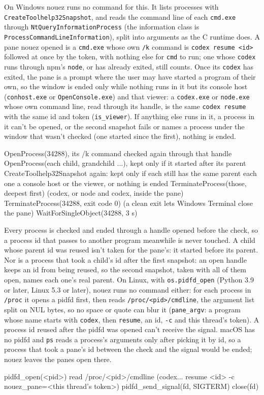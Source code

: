 \documentclass[10pt,a4paper]{article}
\newcommand{\code}[1]{\texttt{#1}}
\begin{document}
On Windows nouez runs no command for this. It lists processes with
\code{CreateToolhelp32Snapshot}, and reads the command line of each \code{cmd.exe} through
\code{NtQueryInformationProcess} (the information class is
\code{ProcessCommandLineInformation}), split into arguments as the C runtime does. A pane nouez opened
is a \code{cmd.exe} whose own \code{/k} command is \code{codex resume <id>} followed at once by the
token, with nothing else for \code{cmd} to run; one whose \code{codex} runs through npm's
\code{node}, or has already exited, still counts. Once its \code{codex} has exited, the pane is a
prompt where the user may have started a program of their own, so the window is ended only while
nothing runs in it but its console host (\code{conhost.exe} or \code{OpenConsole.exe}) and that
viewer: a \code{codex.exe} or \code{node.exe} whose own command line, read through its handle, is
the same \code{codex resume} with the same id and token (\code{is\_viewer}). If anything else runs
in it, a process in it can't be opened, or the second snapshot fails or names a process under the
window that wasn't checked (one started since the first), nothing is ended.

\begin{plain}
OpenProcess(34288), its /k command checked again through that handle
OpenProcess(each child, grandchild ...), kept only if it started after its parent
CreateToolhelp32Snapshot again: kept only if each still has the same parent
each one a console host or the viewer, or nothing is ended
TerminateProcess(those, deepest first)       (codex, or node and codex, inside the pane)
TerminateProcess(34288, exit code 0)         (a clean exit lets Windows Terminal close the pane)
WaitForSingleObject(34288, 3 s)
\end{plain}

Every process is checked and ended through a handle opened before the check, so a process id
that passes to another program meanwhile is never touched. A child whose parent id was reused
isn't taken for the pane's: it started before its parent. Nor is a process that took a child's id
after the first snapshot: an open handle keeps an id from being reused, so the second snapshot,
taken with all of them open, names each one's real parent.
On Linux, with \code{os.pidfd\_open} (Python 3.9 or later, Linux 5.3 or later), nouez runs no command
either: for each process in \code{/proc} it opens a pidfd first, then reads
\code{/proc/<pid>/cmdline}, the argument list split on NUL bytes, so no space or quote can blur it
(\code{pane\_argv}: a program whose name starts with \code{codex}, then \code{resume}, an id, \code{-c}
and this thread's token). A process id reused after the pidfd was opened can't receive the signal.
macOS has no pidfd and \code{ps} reads a process's arguments only after picking it by id, so a
process that took a pane's id between the check and the signal would be ended; nouez leaves the
panes open there.
\begin{plain}
pidfd_open(<pid>)
read /proc/<pid>/cmdline    (codex... resume <id> -c nouez_pane=<this thread's token>)
pidfd_send_signal(fd, SIGTERM)
close(fd)
\end{plain}
\end{document}
